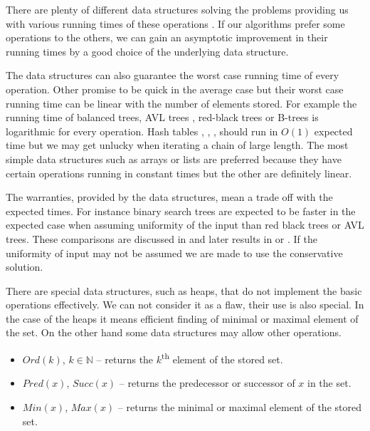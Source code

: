 There are plenty of different data structures solving the problems providing us with various running times of these operations \cite{Cormen01introductionto}. If our algorithms prefer some operations to the others, we can gain an asymptotic improvement in their running times by a good choice of the underlying data structure. 

The data structures can also guarantee the worst case running time of every operation. Other promise to be quick in the average case but their worst case running time can be linear with the number of elements stored. For example the running time of balanced trees, AVL trees \cite{AVL}, red-black trees \cite{DBLP:conf/focs/GuibasS78} or B-trees \cite{DBLP:journals/acta/BayerM72} is logarithmic for every operation. Hash tables \cite{DBLP:books/sp/MehlhornS2008}, \cite{VK-skripta}, \cite{DBLP:journals/jcss/CarterW79}, \cite{The-art-of-computer-programming} should run in $O(1)$ expected time but we may get unlucky when iterating a chain of large length. The most simple data structures such as arrays or lists are preferred because they have certain operations running in constant times but the other are definitely linear.

The warranties, provided by the data structures, mean a trade off with the expected times. For instance binary search trees are expected to be faster in the expected case when assuming uniformity of the input than red black trees or AVL trees. These comparisons are discussed in \cite{63531} and later results in \cite{765571} or \cite{DBLP:journals/algorithmica/Drmota01}. If the uniformity of input may not be assumed we are made to use the conservative solution.

There are special data structures, such as heaps, that do not implement the basic operations effectively. We can not consider it as a flaw, their use is also special. In the case of the heaps it means efficient finding of minimal or maximal element of the set. On the other hand some data structures may allow other operations. 
\begin{itemize}
\item $Ord(k)$, $k \in \mathbb{N}$ -- returns the $k$\textsuperscript{th} element of the stored set.
\item $Pred(x)$, $Succ(x)$ -- returns the predecessor or successor of $x$ in the set.
\item $Min(x)$, $Max(x)$ -- returns the minimal or maximal element of the stored set.
\end{itemize}

